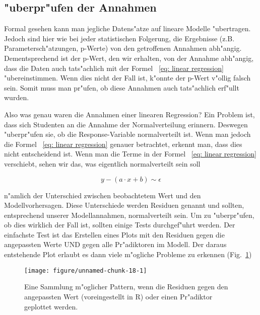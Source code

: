 \documentclass[a4paper,twoside]{tufte-book}\usepackage[]{graphicx}\usepackage[]{color}
\makeatletter
\def\maxwidth{ %
  \ifdim\Gin@nat@width>\linewidth
    \linewidth
  \else
    \Gin@nat@width
  \fi
}
\makeatother
\begin{document}
\subsection{"uberpr"ufen der Annahmen}

Formal gesehen kann man jegliche Datens"atze auf lineare Modelle "ubertragen. Jedoch sind hier wie bei jeder statistischen Folgerung, die Ergebnisse (z.B. Parametersch"atzungen, p-Werte) von den getroffenen Annahmen abh"angig. Dementsprechend ist der p-Wert, den wir erhalten, von der Annahme abh"angig, dass die Daten auch tats"achlich mit der Formel ~\ref{eq: linear regression} "ubereinstimmen. Wenn dies nicht der Fall ist, k"onnte der p-Wert v"ollig falsch sein. Somit muss man pr"ufen, ob diese Annahmen auch tats"achlich erf"ullt wurden.

Also was genau waren die Annahmen einer linearen Regression? Ein Problem ist, dass sich Studenten an die Annahme der Normalverteilung erinnern. Deswegen "uberpr"ufen sie, ob die Response-Variable normalverteilt ist. Wenn man jedoch die Formel ~\ref{eq: linear regression} genauer betrachtet, erkennt man, dass dies nicht entscheidend ist. Wenn man die Terme in der Formel ~\ref{eq: linear regression} verschiebt,
sehen wir das, was eigentlich normalverteilt sein soll

\begin{equation} \label{eq: linear regression}
y - (a \cdot x + b ) \sim \epsilon 
\end{equation}

n"amlich der Unterschied zwischen beobachtetem Wert und den Modellvorhersagen. Diese Unterschiede werden Residuen genannt und sollten, entsprechend unserer Modellannahmen, normalverteilt sein. Um zu "uberpr"ufen, ob dies wirklich der Fall ist, sollten einige Tests durchgef"uhrt werden. Der einfachste Test ist das Erstellen eines Plots mit den Residuen gegen die angepassten Werte UND gegen alle Pr"adiktoren im Modell. Der daraus entstehende Plot erlaubt es dann viele m"ogliche Probleme zu erkennen (Fig.~\ref{fig: ResidualPatterns})

\begin{figure}[htbp]
\begin{center}
\begin{Schunk}

\texttt{[image: figure/unnamed-chunk-18-1]} \end{Schunk}
\caption{Eine Sammlung m"oglicher Pattern, wenn die Residuen gegen den angepassten Wert (voreingestellt in R) oder einen Pr"adiktor geplottet werden.}
\label{fig: ResidualPatterns}
\end{center}
\end{figure}
\end{document}
